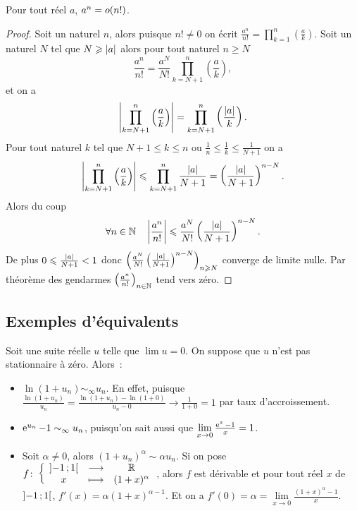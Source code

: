\begin{prop}
  Pour tout réel \(a\), \(a^n=o\mathopen{}\left(n!\right)\).
\end{prop}
\begin{proof}
  Soit un naturel \(n\), alors puisque \(n! \neq 0\) on écrit \(\frac{a^n}{n!}=\prod_{k=1}^n \left(\frac{a}{k}\right)\). Soit un naturel \(N\) tel que \(N \geqslant \left\lvert a\right\rvert\) alors pour tout naturel \(n \geqslant N\)
  \begin{equation}
    \frac{a^n}{n!} = \frac{a^N}{N!} \prod_{k=N+1}^n \left(\frac{a}{k}\right),
  \end{equation}
  et on a
  \begin{equation}
    \left\lvert\prod_{k=N+1}^n \left(\frac{a}{k}\right)\right\rvert = \prod_{k=N+1}^n \left(\frac{\left\lvert a\right\rvert}{k}\right).
  \end{equation}
  Pour tout naturel \(k\) tel que \(N+1 \leqslant k \leqslant n\) ou \(\frac{1}{n} \leqslant \frac{1}{k} \leqslant \frac{1}{N+1}\) on a
  \begin{equation}
    \left\lvert\prod_{k=N+1}^n \left(\frac{a}{k}\right)\right\rvert \leqslant \prod_{k=N+1}^n \frac{\left\lvert a\right\rvert}{N+1} = \left(\frac{\left\lvert a\right\rvert}{N+1}\right)^{n-N}.
  \end{equation}
  Alors du coup
  \begin{equation}
    \forall n \in \mathbb{N} \quad \left\lvert\frac{a^n}{n!}\right\rvert \leqslant \frac{a^N}{N!} \left(\frac{\left\lvert a\right\rvert}{N+1}\right)^{n-N}.
  \end{equation}
  De plus \(0 \leqslant \frac{\left\lvert a\right\rvert}{N+1} < 1\) donc \(\left(\frac{a^N}{N!} \left(\frac{\left\lvert a\right\rvert}{N+1}\right)^{n-N}\right)_{n \geqslant N}\) converge de limite nulle. Par théorème des gendarmes \(\left(\frac{a^n}{n!}\right)_{n\in \mathbb{N}}\) tend vers zéro.
\end{proof}

\subsection{Exemples d'équivalents}

Soit une suite réelle \(u\) telle que \(\lim u = 0\). On suppose que \(u\) n'est pas stationnaire à zéro. Alors~:
\begin{itemize}
    \item \(\ln(1+u_n) \sim_\infty u_n\). En effet, puisque \(\frac{\ln(1+u_n)}{u_n}= \frac{\ln(1+u_n) - \ln(1+0)}{u_n-0} \to \frac{1}{1+0} =1\) par taux d'accroissement. 
    \item \(\operatorname{e}^{u_n}-1 \sim_\infty u_n\), puisqu'on sait aussi que \(\lim\limits_{x \to 0} \frac{\operatorname{e}^{x}-1}{x}=1\).
    \item Soit \(\alpha \neq 0\), alors \((1+u_n)^\alpha \sim \alpha u_n\). Si on pose \(f\colon \left\{\begin{array}{ccc} \left] -1 \, ;  1 \right[ & \longrightarrow &\mathbb{R}\\ x & \longmapsto & (1+x)^\alpha \end{array} \right.\), alors \(f\) est dérivable et pour tout réel \(x\) de \(\left] -1 \, ;  1 \right[\), \(f'(x)=\alpha(1+x)^{\alpha -1}\). Et on a \(f'(0)=\alpha = \lim\limits_{x \to 0}\frac{(1+x)^\alpha-1}{x}\).
\end{itemize}

